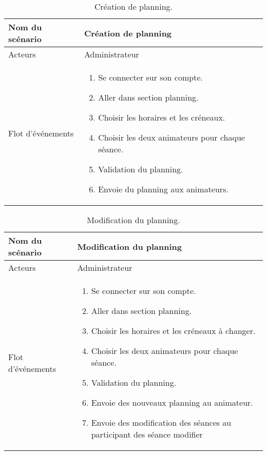 \documentclass{report}
\begin{document}
\begin{table}[htbp]
\begin{center}
\begin{tabular}{|L{4cm}||L{10cm}|}
\hline Nom du scénario &  Création de planning \\
\hline  Acteurs &  Administrateur \\
\hline  Flot d'événements &  \begin{enumerate}
\item Se connecter sur son compte.
\item Aller dans section planning.
\item Choisir les horaires et les créneaux.
\item Choisir les deux animateurs pour chaque séance.
\item Validation du planning.
\item Envoie du planning aux animateurs.
\end{enumerate}\\
\hline
\end{tabular}
\caption{Création de planning.\label{creatplan}}
\end{center}
\end{table}

\begin{table}[htbp]
\begin{center}
\begin{tabular}{|L{4cm}||L{10cm}|}
\hline Nom du scénario &  Modification du planning \\
\hline  Acteurs &  Administrateur \\
\hline  Flot d'événements &  \begin{enumerate}
\item Se connecter sur son compte.
\item Aller dans section planning.
\item Choisir les horaires et les créneaux à changer.
\item Choisir les deux animateurs pour chaque séance.
\item Validation du planning.
\item Envoie des nouveaux planning au animateur.
\item Envoie des modification des séances au participant des séance modifier
\end{enumerate}\\
\hline
\end{tabular}
\caption{Modification du planning.\label{modifplan}}
\end{center}
\end{table}
\end{document}
